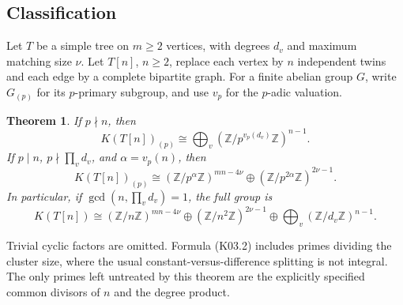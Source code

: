 \documentclass[11pt,a4paper]{article}
\newtheorem{theorem}{Theorem}[section]
\theoremstyle{definition}\newtheorem{definition}[theorem]{Definition}
\theoremstyle{remark}\newtheorem{remark}[theorem]{Remark}
\newcommand{\Z}{\mathbb Z}\newcommand{\Q}{\mathbb Q}\newcommand{\F}{\mathbb F}
\numberwithin{equation}{section}
\begin{document}
\subsection{Classification}\label{K03-sec-1}
Let $T$ be a simple tree on $m\geq2$ vertices, with degrees $d_v$ and maximum matching size $\nu$. Let $T[n]$, $n\geq2$, replace each vertex by $n$ independent twins and each edge by a complete bipartite graph. For a finite abelian group $G$, write $G_{(p)}$ for its $p$-primary subgroup, and use $v_p$ for the $p$-adic valuation.
\begin{theorem}\label{K03-main}
If $p\nmid n$, then
\[
 K(T[n])_{(p)}\cong\bigoplus_v
       \left(\Z/p^{v_p(d_v)}\Z\right)^{n-1}.                  \tag{K03.1}
\]
If $p\mid n$, $p\nmid\prod_vd_v$, and $\alpha=v_p(n)$, then
\[
 K(T[n])_{(p)}\cong
 (\Z/p^\alpha\Z)^{mn-4\nu}\oplus
 (\Z/p^{2\alpha}\Z)^{2\nu-1}.                               \tag{K03.2}
\]
In particular, if $\gcd(n,\prod_vd_v)=1$, the full group is
\[
 K(T[n])\cong (\Z/n\Z)^{mn-4\nu}\oplus
 (\Z/n^2\Z)^{2\nu-1}\oplus
 \bigoplus_v(\Z/d_v\Z)^{n-1}.                               \tag{K03.3}
\]
\end{theorem}
Trivial cyclic factors are omitted. Formula (K03.2) includes primes dividing the cluster size, where the usual constant-versus-difference splitting is not integral. The only primes left untreated by this theorem are the explicitly specified common divisors of $n$ and the degree product.
\end{document}
